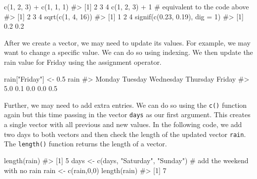 \documentclass[
  letterpaper,
]{latex/krantz}
\makeatletter
\newenvironment{Shaded}{\begin{snugshade}}{\end{snugshade}}
\newcommand{\AttributeTok}[1]{\textcolor[rgb]{0.40,0.45,0.13}{#1}}
\newcommand{\CommentTok}[1]{\textcolor[rgb]{0.37,0.37,0.37}{#1}}
\newcommand{\DecValTok}[1]{\textcolor[rgb]{0.68,0.00,0.00}{#1}}
\newcommand{\FloatTok}[1]{\textcolor[rgb]{0.68,0.00,0.00}{#1}}
\newcommand{\FunctionTok}[1]{\textcolor[rgb]{0.28,0.35,0.67}{#1}}
\newcommand{\NormalTok}[1]{\textcolor[rgb]{0.00,0.23,0.31}{#1}}
\newcommand{\OtherTok}[1]{\textcolor[rgb]{0.00,0.23,0.31}{#1}}
\newcommand{\SpecialCharTok}[1]{\textcolor[rgb]{0.37,0.37,0.37}{#1}}
\newcommand{\StringTok}[1]{\textcolor[rgb]{0.13,0.47,0.30}{#1}}
\newenvironment{kframe}{%
\medskip{}
\setlength{\fboxsep}{.8em}
 \def\at@end@of@kframe{}%
 \ifinner\ifhmode%
  \def\at@end@of@kframe{\end{minipage}}%
  \begin{minipage}{\columnwidth}%
 \fi\fi%
 \def\FrameCommand##1{\hskip\@totalleftmargin \hskip-\fboxsep
 \colorbox{shadecolor}{##1}\hskip-\fboxsep
     \hskip-\linewidth \hskip-\@totalleftmargin \hskip\columnwidth}%
 \MakeFramed {\advance\hsize-\width
   \@totalleftmargin\z@ \linewidth\hsize
   \@setminipage}}%
 {\par\unskip\endMakeFramed%
 \at@end@of@kframe}
\renewenvironment{Shaded}{\begin{kframe}}{\end{kframe}}
\makeatother
\begin{document}
\begin{Shaded}
\begin{Highlighting}[]
\FunctionTok{c}\NormalTok{(}\DecValTok{1}\NormalTok{, }\DecValTok{2}\NormalTok{, }\DecValTok{3}\NormalTok{) }\SpecialCharTok{+} \FunctionTok{c}\NormalTok{(}\DecValTok{1}\NormalTok{, }\DecValTok{1}\NormalTok{, }\DecValTok{1}\NormalTok{)}
\CommentTok{\#\textgreater{} [1] 2 3 4}
\FunctionTok{c}\NormalTok{(}\DecValTok{1}\NormalTok{, }\DecValTok{2}\NormalTok{, }\DecValTok{3}\NormalTok{) }\SpecialCharTok{+} \DecValTok{1} \CommentTok{\# equivalent to the code above}
\CommentTok{\#\textgreater{} [1] 2 3 4}
\FunctionTok{sqrt}\NormalTok{(}\FunctionTok{c}\NormalTok{(}\DecValTok{1}\NormalTok{, }\DecValTok{4}\NormalTok{, }\DecValTok{16}\NormalTok{))}
\CommentTok{\#\textgreater{} [1] 1 2 4}
\FunctionTok{signif}\NormalTok{(}\FunctionTok{c}\NormalTok{(}\FloatTok{0.23}\NormalTok{, }\FloatTok{0.19}\NormalTok{), }\AttributeTok{dig =} \DecValTok{1}\NormalTok{)}
\CommentTok{\#\textgreater{} [1] 0.2 0.2}
\end{Highlighting}
\end{Shaded}

After we create a vector, we may need to update its values. For example,
we may want to change a specific value. We can do so using indexing. We
then update the rain value for Friday using the assignment operator.

\begin{Shaded}
\begin{Highlighting}[]
\NormalTok{rain[}\StringTok{"Friday"}\NormalTok{] }\OtherTok{\textless{}{-}} \FloatTok{0.5}
\NormalTok{rain}
\CommentTok{\#\textgreater{}    Monday   Tuesday Wednesday  Thursday    Friday }
\CommentTok{\#\textgreater{}       5.0       0.1       0.0       0.0       0.5}
\end{Highlighting}
\end{Shaded}

Further, we may need to add extra entries. We can do so using the
\texttt{c()} function again but this time passing in the vector
\texttt{days} as our first argument. This creates a single vector with
all previous and new values. In the following code, we add two days to
both vectors and then check the length of the updated vector
\texttt{rain}. The
\texttt{length()} function
returns the length of a vector.

\begin{Shaded}
\begin{Highlighting}[]
\FunctionTok{length}\NormalTok{(rain)}
\CommentTok{\#\textgreater{} [1] 5}
\NormalTok{days }\OtherTok{\textless{}{-}} \FunctionTok{c}\NormalTok{(days, }\StringTok{"Saturday"}\NormalTok{, }\StringTok{"Sunday"}\NormalTok{) }\CommentTok{\# add the weekend with no rain}
\NormalTok{rain }\OtherTok{\textless{}{-}} \FunctionTok{c}\NormalTok{(rain,}\DecValTok{0}\NormalTok{,}\DecValTok{0}\NormalTok{)}
\FunctionTok{length}\NormalTok{(rain)}
\CommentTok{\#\textgreater{} [1] 7}
\end{Highlighting}
\end{Shaded}
\end{document}

